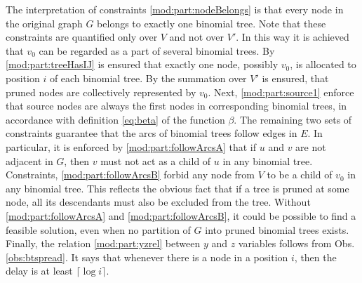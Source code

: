 The interpretation of constraints \eqref{mod:part:nodeBelongs} is that every node in the original graph $G$ belongs to exactly one binomial tree.
Note that these constraints are quantified only over $V$ and not over $V'$.
In this way it is achieved that $v_0$ can be regarded as a part of several binomial trees.
By \eqref{mod:part:treeHasIJ} is ensured that exactly one node, possibly $v_0$, is allocated to position $i$ of each binomial tree.
By the summation over $V'$ is ensured, that pruned nodes are collectively represented by $v_0$.
Next, \eqref{mod:part:source1} enforce that source nodes are always the first nodes in corresponding binomial trees, in accordance with definition \eqref{eq:beta} of the function $\beta$.
The remaining two sets of constraints guarantee that the arcs of binomial trees follow edges in $E$.
In particular, it is enforced by \eqref{mod:part:followArcsA} that if $u$ and $v$ are not adjacent in $G$, then $v$ must not act as a child of $u$ in any binomial tree.
Constraints, \eqref{mod:part:followArcsB} forbid any node from $V$ to be a child of $v_0$ in any binomial tree. 
This reflects the obvious fact that if a tree is pruned at some node, all its descendants must also be excluded from the tree.
Without \eqref{mod:part:followArcsA} and \eqref{mod:part:followArcsB}, it could be possible to find a feasible solution, even when no partition of $G$ into pruned binomial trees exists.
Finally, the relation \eqref{mod:part:yzrel} between $y$ and $z$ variables follows from Obs. \ref{obs:btspread}. 
It says that whenever there is a node in a position $i$, then the delay is at least $\lceil\log i\rceil$.
%
